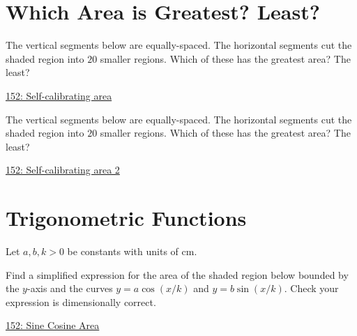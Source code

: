 \documentclass{ximera}
\begin{document}
\section{Which Area is Greatest? Least?}

\begin{question} \label{QPlerredd}

The vertical segments below are equally-spaced. The horizontal segments cut the shaded region into $20$ smaller regions. Which of these has the greatest area? The least?

\begin{onlineOnly}
    \begin{center}
\end{center}
\end{onlineOnly}

\href{https://www.desmos.com/calculator/wsgteg55ta}{152: Self-calibrating area}
\end{question}

\begin{question} \label{QPldfefdfsdfd}

The vertical segments below are equally-spaced. The horizontal segments cut the shaded region into $20$ smaller regions. Which of these has the greatest area? The least?

\begin{onlineOnly}
    \begin{center}
\end{center}
\end{onlineOnly}

\href{https://www.desmos.com/calculator/dir9hpzvse}{152: Self-calibrating area 2}
\end{question}


\section{Trigonometric Functions}

\begin{question} \label{QLkfeREdfd}
Let $a,b,k>0$ be constants with units of cm.

Find a simplified expression for the area of the shaded region below bounded by the $y$-axis and the curves $y=a\cos (x/k)$ and $y=b\sin (x/k)$. Check your expression is dimensionally correct.

\begin{onlineOnly}
    \begin{center}
\end{center}
\end{onlineOnly}

\href{https://www.desmos.com/calculator/ps1m0hksl0}{152: Sine Cosine Area}
\end{question}
\end{document}
